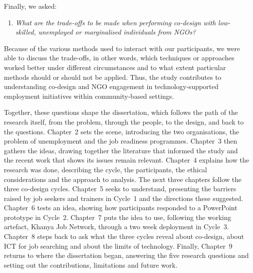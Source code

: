 {Finally, we asked:

\begin{enumerate}[label=RQ\arabic*:, resume]
    \item \textit{What are the trade-offs to be made when performing co-design with low-skilled, unemployed or marginalised individuals from NGOs?}
\end{enumerate}

Because of the various methods used to interact with our participants, we were able to discuss the trade-offs, in other words, which techniques or approaches worked better under different circumstances and to what extent particular methods should or should not be applied. Thus, the study contributes to understanding co-design and NGO engagement in technology-supported employment initiatives within community-based settings.
}

Together, these questions shape the dissertation, which follows the path of the research itself, from the problem, through the people, to the design, and back to the questions. Chapter~2 sets the scene, introducing the two organisations, the problem of unemployment and the job readiness programmes. Chapter~3 then gathers the ideas, drawing together the literature that informed the study and the recent work that shows its issues remain relevant. Chapter~4 explains how the research was done, describing the \tme{} cycle, the participants, the ethical considerations and the approach to analysis. The next three chapters follow the three co-design cycles. Chapter~5 seeks to understand, presenting the barriers raised by job seekers and trainers in Cycle~1 and the directions these suggested. Chapter~6 tests an idea, showing how participants responded to a PowerPoint prototype in Cycle~2. Chapter~7 puts the idea to use, following the working artefact, Khanya Job Network, through a two week deployment in Cycle~3. Chapter~8 steps back to ask what the three cycles reveal about co-design, about ICT for job searching and about the limits of technology. Finally, Chapter~9 returns to where the dissertation began, answering the five research questions and setting out the contributions, limitations and future work.

